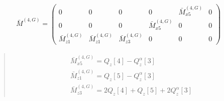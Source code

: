 \documentclass[fleqn,10pt]{jsarticle}
\begin{document}
\begin{align*}
\bar{M}^{(4,G)} = \begin{pmatrix} 0 & 0 & 0 & 0 & \bar{M}^{(4,G)}_{x5} & 0 \\ 0 & 0 & 0 & \bar{M}^{(4,G)}_{x5} & 0 & 0 \\ \bar{M}^{(4,G)}_{z1} & \bar{M}^{(4,G)}_{z1} & \bar{M}^{(4,G)}_{z3} & 0 & 0 & 0 \end{pmatrix}
\end{align*}
\begin{quote}
\begin{align*}
& \bar{M}^{(4,G)}_{x5} = Q_{z}[4] - Q_{z}^{\alpha}[3] \\
& \bar{M}^{(4,G)}_{z1} = Q_{z}[5] - Q_{z}^{\alpha}[3] \\
& \bar{M}^{(4,G)}_{z3} = 2 Q_{z}[4] + Q_{z}[5] + 2 Q_{z}^{\alpha}[3]
\end{align*}
\end{quote}
\end{document}
